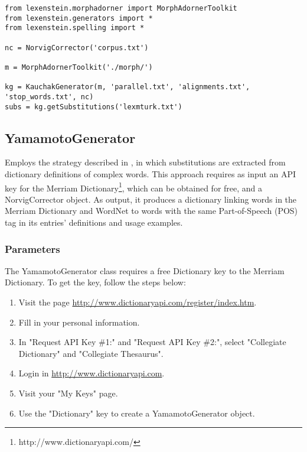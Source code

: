 \begin{lstlisting}
from lexenstein.morphadorner import MorphAdornerToolkit
from lexenstein.generators import *
from lexenstein.spelling import *

nc = NorvigCorrector('corpus.txt')

m = MorphAdornerToolkit('./morph/')

kg = KauchakGenerator(m, 'parallel.txt', 'alignments.txt', 'stop_words.txt', nc)
subs = kg.getSubstitutions('lexmturk.txt')
\end{lstlisting}

































\subsection{YamamotoGenerator}

Employs the strategy described in \cite{Yamamoto2013}, in which substitutions are extracted from dictionary definitions of complex words. This approach requires as input an API key for the Merriam Dictionary\footnote{http://www.dictionaryapi.com/}, which can be obtained for free, and a NorvigCorrector object. As output, it produces a dictionary linking words in the Merriam Dictionary and WordNet to words with the same Part-of-Speech (POS) tag in its entries' definitions and usage examples.

\subsubsection{Parameters}

The YamamotoGenerator class requires a free Dictionary key to the Merriam Dictionary. To get the key, follow the steps below:

\begin{enumerate}
\item Visit the page \url{http://www.dictionaryapi.com/register/index.htm}.
\item Fill in your personal information.
\item In "Request API Key \#1:" and "Request API Key \#2:", select "Collegiate Dictionary" and "Collegiate Thesaurus".
\item Login in \url{http://www.dictionaryapi.com}.
\item Visit your "My Keys" page.
\item Use the "Dictionary" key to create a YamamotoGenerator object.
\end{enumerate}

